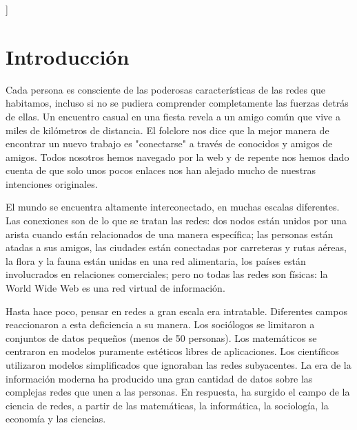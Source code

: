 \documentclass[a4paper,10pt,twocolumn]{article}
\begin{document}


\vspace{0.8cm}
]



\section{Introducción}\label{sec:intro}
  Cada persona es consciente de las poderosas características de las redes que habitamos, incluso si no se pudiera comprender completamente las fuerzas detrás de ellas. Un encuentro casual en una fiesta revela a un amigo común que vive a miles de kilómetros de distancia. El folclore nos dice que la mejor manera de encontrar un nuevo trabajo es "conectarse" a través de conocidos y amigos de amigos. Todos nosotros hemos navegado por la web y de repente nos hemos dado cuenta de que solo unos pocos enlaces nos han alejado mucho de nuestras intenciones originales.

  El mundo se encuentra altamente interconectado, en muchas escalas diferentes. Las conexiones son de lo que se tratan las redes: dos nodos están unidos por una arista cuando están relacionados de una manera específica; las personas están atadas a sus amigos, las ciudades están conectadas por carreteras y rutas aéreas, la flora y la fauna están unidas en una red alimentaria, los países están involucrados en relaciones comerciales; pero no todas las redes son físicas: la World Wide Web es una red virtual de información.

  Hasta hace poco, pensar en redes a gran escala era intratable. Diferentes campos reaccionaron a esta deficiencia a su manera. Los sociólogos se limitaron a conjuntos de datos pequeños (menos de 50 personas). Los matemáticos se centraron en modelos puramente estéticos libres de aplicaciones. Los científicos utilizaron modelos simplificados que ignoraban las redes subyacentes. La era de la información moderna ha producido una gran cantidad de datos sobre las complejas redes que unen a las personas. En respuesta, ha surgido el campo de la ciencia de redes, a partir de las matemáticas, la informática, la sociología, la economía y las ciencias.
\end{document}
